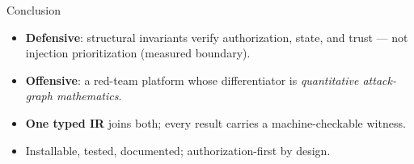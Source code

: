 \documentclass[aspectratio=169,10pt]{beamer}
\begin{document}
\begin{frame}{Conclusion}
  \begin{itemize}
    \item \textbf{Defensive}: structural invariants verify authorization, state, and trust --- not injection prioritization (measured boundary).
    \item \textbf{Offensive}: a red-team platform whose differentiator is \emph{quantitative attack-graph mathematics}.
    \item \textbf{One typed IR} joins both; every result carries a machine-checkable witness.
    \item Installable, tested, documented; authorization-first by design.
  \end{itemize}
\end{frame}
\end{document}
